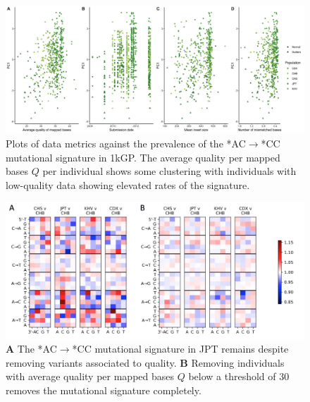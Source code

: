 \documentclass[9pt,lineno]{elife}
\begin{document}
\begin{figure}[h]
\includegraphics[width=\hsize,keepaspectratio]{./Figures/PC1_Correlation.jpg}
\caption{Plots of data metrics against the prevalence of the  *AC${\rightarrow}$*CC mutational signature in 1kGP. The average quality per mapped bases $Q$ per individual shows some clustering with individuals with low-quality data showing elevated rates of the signature.  }
\label{PC1_Correlation}
\end{figure}

\begin{figure}[h]
\includegraphics[width=\hsize,keepaspectratio]{./Figures/MutationSpectrum_cutOff.png}
\caption{\textbf{A} 
The  *AC${\rightarrow}$*CC mutational signature in JPT remains despite removing variants associated to quality. 
\textbf{B} 
Removing individuals with average quality per mapped bases $Q$ below a threshold of 30 removes the mutational signature completely. }
\label{MutSpect}
\end{figure}
\end{document}

